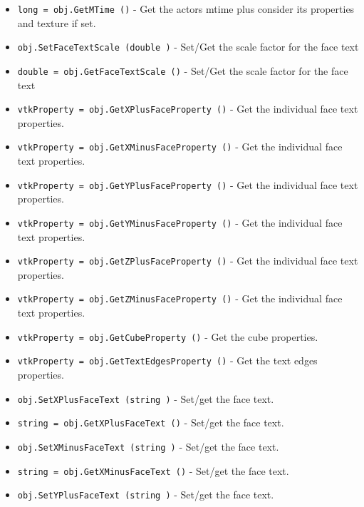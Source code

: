 \begin{itemize}
\item  \verb|long = obj.GetMTime ()| -  Get the actors mtime plus consider its properties and texture if set.

\item  \verb|obj.SetFaceTextScale (double )| -  Set/Get the scale factor for the face text

\item  \verb|double = obj.GetFaceTextScale ()| -  Set/Get the scale factor for the face text

\item  \verb|vtkProperty = obj.GetXPlusFaceProperty ()| -  Get the individual face text properties.

\item  \verb|vtkProperty = obj.GetXMinusFaceProperty ()| -  Get the individual face text properties.

\item  \verb|vtkProperty = obj.GetYPlusFaceProperty ()| -  Get the individual face text properties.

\item  \verb|vtkProperty = obj.GetYMinusFaceProperty ()| -  Get the individual face text properties.

\item  \verb|vtkProperty = obj.GetZPlusFaceProperty ()| -  Get the individual face text properties.

\item  \verb|vtkProperty = obj.GetZMinusFaceProperty ()| -  Get the individual face text properties.

\item  \verb|vtkProperty = obj.GetCubeProperty ()| -  Get the cube properties.

\item  \verb|vtkProperty = obj.GetTextEdgesProperty ()| -  Get the text edges properties.

\item  \verb|obj.SetXPlusFaceText (string )| -  Set/get the face text.

\item  \verb|string = obj.GetXPlusFaceText ()| -  Set/get the face text.

\item  \verb|obj.SetXMinusFaceText (string )| -  Set/get the face text.

\item  \verb|string = obj.GetXMinusFaceText ()| -  Set/get the face text.

\item  \verb|obj.SetYPlusFaceText (string )| -  Set/get the face text.


\end{itemize}

